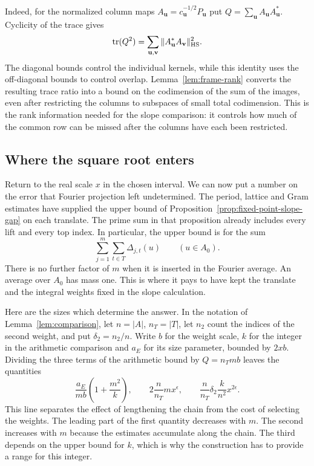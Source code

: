 Indeed, for the normalized column maps \(A_{\mathbf u}=c_{\mathbf u}^{-1/2}P_{\mathbf u}\) put \(Q=\sum_{\mathbf u} A_{\mathbf u}A_{\mathbf u}^*\). Cyclicity of the trace gives
\[
 \operatorname{tr}(Q^2)=\sum_{\mathbf u,\mathbf v}\|A_{\mathbf u}^*A_{\mathbf v}\|_{\rm HS}^2 .
\]
The diagonal bounds control the individual kernels, while this identity uses the off-diagonal bounds to control overlap. Lemma~\ref{lem:frame-rank} converts the resulting trace ratio into a bound on the codimension of the sum of the images, even after restricting the columns to subspaces of small total codimension. This is the rank information needed for the slope comparison: it controls how much of
the common row can be missed after the columns have each been restricted.

\subsection{Where the square root enters}

Return to the real scale \(x\) in the chosen interval. We can now put a number on the
error that Fourier projection left undetermined. The
period, lattice and Gram estimates have supplied the upper bound
of Proposition~\ref{prop:fixed-point-slope-gap} on each translate.
The prime sum in that proposition already includes every lift and
every top index. In particular, the upper bound is for the sum
\[
             \sum_{j=1}^m\sum_{t\in T}\Delta_{j,t}(u)
                       \qquad(u\in A_0).
\]
There is no further factor of \(m\) when it is inserted in the Fourier
average. An average over \(A_0\) has mass one. This is where it pays
to have kept the translate and the integral weights fixed in the
slope calculation.

Here are the sizes which determine the answer. In the notation of
Lemma~\ref{lem:comparison}, let \(n=|A|\), \(n_T=|T|\), let \(n_2\)
count the indices of the second weight, and put \(\delta_2=n_2/n\).
Write \(b\) for the weight scale, \(k\) for the integer in the
arithmetic comparison and \(a_E\) for its size parameter, bounded
by \(2xb\). Dividing the three terms of the arithmetic bound by
\(Q=n_Tmb\) leaves the quantities
\[
 \frac{a_E}{mb}\left(1+\frac{m^2}{k}\right),\qquad
        2\frac n{n_T}m x^\epsilon,\qquad
        \frac n{n_T}\delta_2\frac{k}{n^2}x^{2\epsilon}.
\]
This line separates the effect of lengthening the chain from the
cost of selecting the weights. The leading part of the first
quantity decreases with \(m\). The second increases with \(m\)
because the estimates accumulate along the chain. The third
depends on the upper bound for \(k\), which is why the construction
has to provide a range for this integer.

